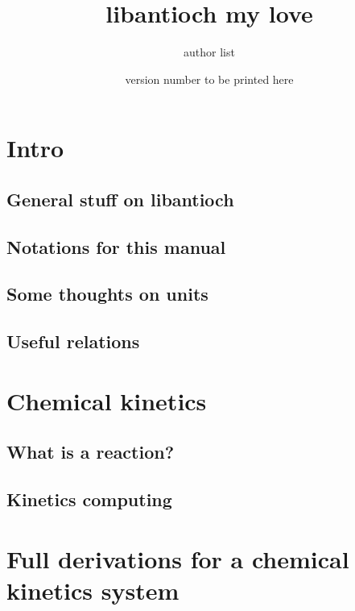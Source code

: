 \documentclass{article}
\begin{document}
\title{libantioch my love}
\date{version number to be printed here}
\author{author list}

\maketitle
\tableofcontents

\section{Intro}

\subsection{General stuff on libantioch}


\subsection{Notations for this manual}


\subsection{Some thoughts on units}
\label{units_in_Antioch}


\subsection{Useful relations}
\label{relations}


\section{Chemical kinetics}
\subsection{What is a reaction?}
\label{kinetics_gen}

\subsection{Kinetics computing}
\label{kinetics_comput}


\section{Full derivations for a chemical kinetics system}
\label{derivations}

\end{document}
